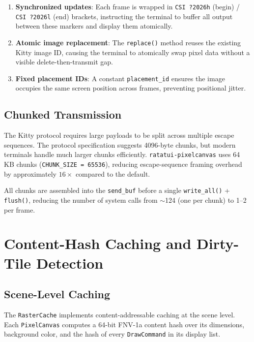 \documentclass[11pt, a4paper, twocolumn]{article}
\begin{document}
\begin{enumerate}[leftmargin=1.5em, itemsep=0.1em]
    \item \textbf{Synchronized updates}: Each frame is wrapped in \texttt{CSI ?2026h} (begin) / \texttt{CSI ?2026l} (end) brackets, instructing the terminal to buffer all output between these markers and display them atomically.
    \item \textbf{Atomic image replacement}: The \texttt{replace()} method reuses the existing Kitty image ID, causing the terminal to atomically swap pixel data without a visible delete-then-transmit gap.
    \item \textbf{Fixed placement IDs}: A constant \texttt{placement\_id} ensures the image occupies the same screen position across frames, preventing positional jitter.
\end{enumerate}

\subsection{Chunked Transmission}

The Kitty protocol requires large payloads to be split across multiple escape sequences.
The protocol specification suggests 4096-byte chunks, but modern terminals handle much larger chunks efficiently.
\texttt{ratatui-pixelcanvas} uses 64 KB chunks (\texttt{CHUNK\_SIZE = 65536}), reducing escape-sequence framing overhead by approximately $16\times$ compared to the default.

All chunks are assembled into the \texttt{send\_buf} before a single \texttt{write\_all()} + \texttt{flush()}, reducing the number of system calls from $\sim$124 (one per chunk) to 1--2 per frame.

\section{Content-Hash Caching and Dirty-Tile Detection}
\label{sec:caching}

\subsection{Scene-Level Caching}

The \texttt{RasterCache} implements content-addressable caching at the scene level.
Each \texttt{PixelCanvas} computes a 64-bit FNV-1a content hash over its dimensions, background color, and the hash of every \texttt{DrawCommand} in its display list.
\end{document}

